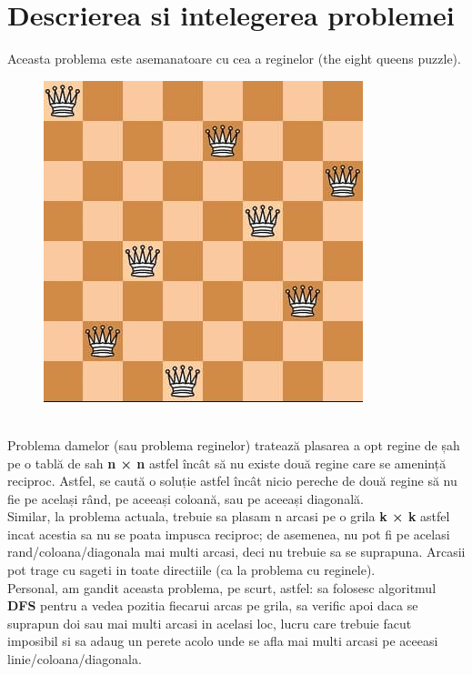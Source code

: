 \documentclass{article}
\begin{document}
\section{Descrierea si intelegerea problemei}
\vspace{0.9cm} 
\hspace{1cm} Aceasta problema este asemanatoare cu cea a reginelor (the eight queens puzzle). \\
\begin{figure}[htbp!]
\centering
\includegraphics[scale=0.7]{queens}
\end{figure}\\

\hspace{1cm}Problema damelor (sau problema reginelor) tratează plasarea a opt regine de șah pe o tablă de sah \textbf{n × n} astfel încât să nu existe două regine care se amenință reciproc. Astfel, se caută o soluție astfel încât nicio pereche de două regine să nu fie pe același rând, pe aceeași coloană, sau pe aceeași diagonală. \\

\hspace{1cm}Similar, la problema actuala, trebuie sa plasam n arcasi pe o grila \textbf{k × k} astfel incat acestia sa nu se poata impusca reciproc; de asemenea, nu pot fi pe acelasi rand/coloana/diagonala mai multi arcasi, deci nu trebuie sa se suprapuna. Arcasii pot trage cu sageti in toate directiile (ca la problema cu reginele).\\

\hspace{1cm}Personal, am gandit aceasta problema, pe scurt, astfel: sa folosesc algoritmul \textbf{DFS} pentru a vedea pozitia fiecarui arcas pe grila, sa verific apoi daca se suprapun doi sau mai multi arcasi in acelasi loc, lucru care trebuie facut imposibil si sa adaug un perete acolo unde se afla mai multi arcasi pe aceeasi linie/coloana/diagonala.\\
 
\end{document}
